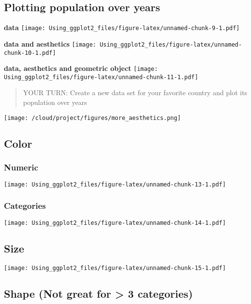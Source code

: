 \documentclass[]{article}
\begin{document}
\hypertarget{plotting-population-over-years}{%
\subsection{Plotting population over
years}\label{plotting-population-over-years}}

\textbf{data}
\texttt{[image: Using\_ggplot2\_files/figure-latex/unnamed-chunk-9-1.pdf]}

\textbf{data and aesthetics}
\texttt{[image: Using\_ggplot2\_files/figure-latex/unnamed-chunk-10-1.pdf]}

\textbf{data, aesthetics and geometric object}
\texttt{[image: Using\_ggplot2\_files/figure-latex/unnamed-chunk-11-1.pdf]}

\begin{quote}
YOUR TURN: Create a new data set for your favorite country and plot its
population over years
\end{quote}

\texttt{[image: /cloud/project/figures/more\_aesthetics.png]}

\hypertarget{color}{%
\subsection{Color}\label{color}}

\hypertarget{numeric}{%
\subsubsection{Numeric}\label{numeric}}

\texttt{[image: Using\_ggplot2\_files/figure-latex/unnamed-chunk-13-1.pdf]}

\hypertarget{categories}{%
\subsubsection{Categories}\label{categories}}

\texttt{[image: Using\_ggplot2\_files/figure-latex/unnamed-chunk-14-1.pdf]}

\hypertarget{size}{%
\subsection{Size}\label{size}}

\texttt{[image: Using\_ggplot2\_files/figure-latex/unnamed-chunk-15-1.pdf]}

\hypertarget{shape-not-great-for-3-categories}{%
\subsection{Shape (Not great for \textgreater{} 3
categories)}\label{shape-not-great-for-3-categories}}
\end{document}
